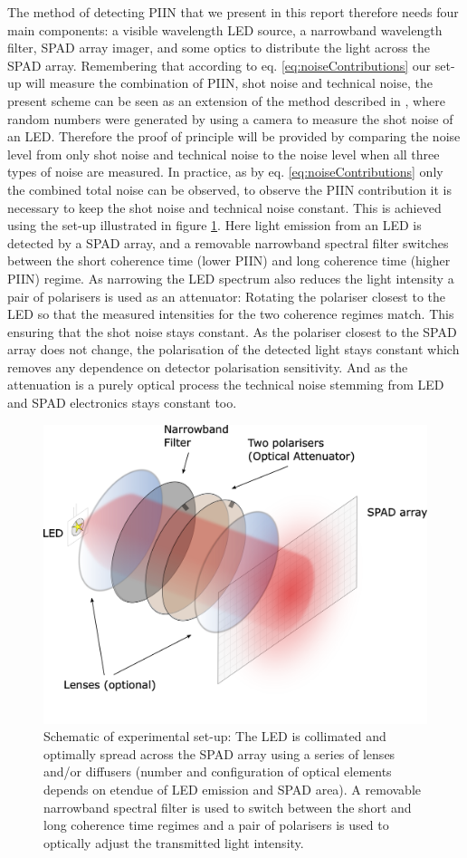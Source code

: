 \documentclass[]{article}
\begin{document}
	The method of detecting PIIN that we present in this report therefore needs four main components: a visible wavelength LED source, a narrowband wavelength filter, SPAD array imager, and some optics to distribute the light across the SPAD array. Remembering that according to eq. \ref{eq:noiseContributions} our set-up will measure the combination of PIIN, shot noise and technical noise, the present scheme can be seen as an extension of the method described in \cite{sanguinetti_quantum_2014}, where random numbers were generated by using a camera to measure the shot noise of an LED. Therefore the proof of principle will be provided by comparing the noise level from only shot noise and technical noise to the noise level when all three types of noise are measured. In practice, as by eq. \ref{eq:noiseContributions} only the combined total noise can be observed, to observe the PIIN contribution it is necessary to keep the shot noise and technical noise constant. This is achieved using the set-up illustrated in figure \ref{fig:ledsetup1v2}. Here light emission from an LED is detected by a SPAD array, and a removable narrowband spectral filter switches between the short coherence time (lower PIIN) and long coherence time (higher PIIN) regime. As narrowing the LED spectrum also reduces the light intensity a pair of polarisers is used as an attenuator: Rotating the polariser closest to the LED so that the measured intensities for the two coherence regimes match. This ensuring that the shot noise stays constant. As the polariser closest to the SPAD array does not change, the polarisation of the detected light stays constant which removes any dependence on detector polarisation sensitivity. And as the attenuation is a purely optical process the technical noise stemming from LED and SPAD electronics stays constant too.
		
		\begin{figure}[hb]
		\centering
		\includegraphics[width=0.6\linewidth]{Figures/LED_setup1_v2}
		\caption{Schematic of experimental set-up: The LED is collimated and optimally spread across the SPAD array using a series of lenses and/or diffusers (number and configuration of optical elements depends on etendue of LED emission and SPAD area). A removable narrowband spectral filter is used to switch between the short and long coherence time regimes and a pair of polarisers is used to optically adjust the transmitted light intensity.}
		\label{fig:ledsetup1v2}
		\end{figure}
	
\end{document}
